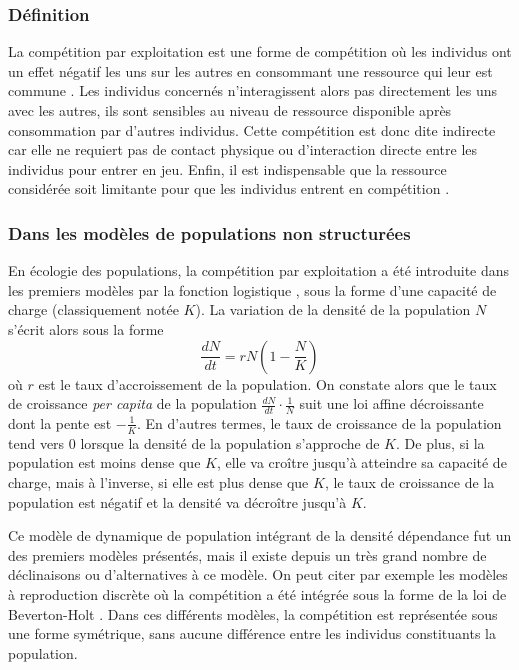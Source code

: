 \subsubsection{Définition}


La compétition par exploitation est une forme de compétition où les
individus ont un effet négatif les uns sur les autres en consommant une
ressource qui leur est commune \autocites{goss-custard1980a,
vance1984a, begon2009a}. Les individus concernés n'interagissent alors pas directement les
uns avec les autres, ils sont sensibles au niveau de ressource
disponible après consommation par d'autres individus. Cette compétition est
donc dite indirecte car elle ne requiert pas de contact physique ou
d'interaction directe entre les individus pour entrer en jeu. Enfin, il est
indispensable que la ressource considérée soit limitante pour que les individus
entrent en compétition \autocites{begon2009a}. 

\subsubsection{Dans les modèles de populations non structurées}

En écologie des populations, la compétition par exploitation a été introduite 
dans les premiers modèles par la fonction logistique
\autocites{verhulst1838a}, sous la forme d'une capacité de charge (classiquement notée $K$). La variation
de la densité de la population $N$ s'écrit alors sous la forme
$$\frac{dN}{dt}=rN \left(1-\frac{N}{K}\right)$$ où $r$ est le taux
d'accroissement de la population. On constate alors que le taux de croissance
\textit{per capita} de la population $\frac{dN}{dt}\cdot \frac{1}{N}$ suit 
une loi affine décroissante dont la pente est $-\frac{1}{K}$. En d'autres termes, le
taux de croissance de la population tend vers 0 lorsque la densité de la
population s'approche de $K$. De plus, si la population est moins dense que $K$,
elle va croître jusqu'à atteindre sa capacité de charge, mais à l'inverse, si
elle est plus dense que $K$, le taux de croissance de la population est négatif
et la densité va décroître jusqu'à $K$.

Ce modèle de dynamique de population intégrant de la densité dépendance fut un
des premiers modèles présentés, mais il existe depuis un très grand nombre de
déclinaisons ou d'alternatives à ce modèle. On peut citer par exemple les
modèles à reproduction discrète où la compétition a été intégrée sous la forme
de la loi de Beverton-Holt \autocites{beverton1957a}. Dans ces différents
modèles, la compétition est représentée sous une forme symétrique, sans aucune différence entre les
individus constituants la population. 

